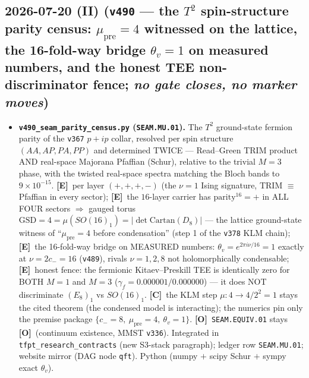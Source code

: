 \documentclass[11pt]{article}
\providecommand{\mE}{\textbf{[E]}}\providecommand{\mC}{\textbf{[C]}}
\providecommand{\mO}{\textbf{[O]}}\providecommand{\mX}{\textbf{[X]}}
\begin{document}
\subsection*{2026-07-20 (II) (\texttt{v490} --- the $T^2$ spin-structure parity census: $\mu_{\mathrm{pre}}{=}4$ witnessed on the lattice, the 16-fold-way bridge $\theta_v{=}1$ on measured numbers, and the honest TEE non-discriminator fence; \emph{no gate closes, no marker moves})}
\begin{itemize}[leftmargin=1.5em]
\item \textbf{\texttt{v490\_seam\_parity\_census.py} (\texttt{SEAM.MU.01}).} The $T^2$ ground-state fermion
parity of the \texttt{v367} $p{+}ip$ collar, resolved per spin structure $(AA,AP,PA,PP)$ and determined
TWICE --- Read--Green TRIM product AND real-space Majorana Pfaffian (Schur), relative to the trivial
$M{=}3$ phase, with the twisted real-space spectra matching the Bloch bands to $9\times10^{-15}$. \mE\
per layer $(+,+,+,-)$ (the $\nu{=}1$ Ising signature, TRIM $\equiv$ Pfaffian in every sector); \mE\ the
$16$-layer carrier has $\mathrm{parity}^{16}={+}$ in ALL FOUR sectors $\Rightarrow$ gauged torus
$\mathrm{GSD}=4=\mu(SO(16)_1)=|\det\mathrm{Cartan}(D_8)|$ --- the lattice ground-state witness of
``$\mu_{\mathrm{pre}}{=}4$ before condensation'' (step 1 of the \texttt{v378} KLM chain); \mE\ the
16-fold-way bridge on MEASURED numbers: $\theta_v=e^{2\pi i\nu/16}=1$ exactly at $\nu=2c_-=16$
(\texttt{v489}), rivals $\nu=1,2,8$ not holomorphically condensable; \mE\ honest fence: the fermionic
Kitaev--Preskill TEE is identically zero for BOTH $M{=}1$ and $M{=}3$ ($\gamma_f{=}0.000001/0.000000$) ---
it does NOT discriminate $(E_8)_1$ vs $SO(16)_1$. \mC\ the KLM step $\mu:4\to4/2^2=1$ stays the cited
theorem (the condensed model is interacting); the numerics pin only the premise package
$\{c_-{=}8,\ \mu_{\mathrm{pre}}{=}4,\ \theta_v{=}1\}$. \mO\ \texttt{SEAM.EQUIV.01} stays \mO\ (continuum
existence, MMST \texttt{v336}). Integrated in \texttt{tfpt\_research\_contracts} (new S3-stack paragraph);
ledger row \texttt{SEAM.MU.01}; website mirror (DAG node \texttt{qft}). Python (numpy $+$ scipy Schur $+$
sympy exact $\theta_v$).
\end{itemize}
\end{document}
